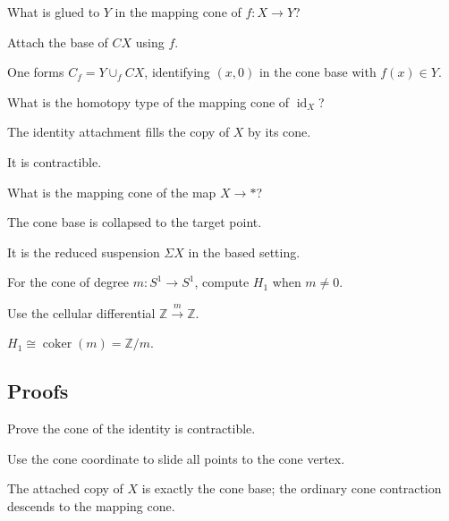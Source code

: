 \begin{exercise}\label{exr:viii07-ped-02}
What is glued to $Y$ in the mapping cone of $f:X\to Y$?
\end{exercise}
\begin{hint}
Attach the base of $CX$ using $f$.
\end{hint}
\begin{solution}
One forms $C_f=Y\cup_f CX$, identifying $(x,0)$ in the cone base with $f(x)\in Y$.
\end{solution}

\begin{exercise}\label{exr:viii07-ped-03}
What is the homotopy type of the mapping cone of $\operatorname{id}_X$?
\end{exercise}
\begin{hint}
The identity attachment fills the copy of $X$ by its cone.
\end{hint}
\begin{solution}
It is contractible.
\end{solution}

\begin{exercise}\label{exr:viii07-ped-04}
What is the mapping cone of the map $X\to *$?
\end{exercise}
\begin{hint}
The cone base is collapsed to the target point.
\end{hint}
\begin{solution}
It is the reduced suspension $\Sigma X$ in the based setting.
\end{solution}

\begin{exercise}\label{exr:viii07-ped-05}
For the cone of degree $m:S^1\to S^1$, compute $H_1$ when $m\ne0$.
\end{exercise}
\begin{hint}
Use the cellular differential $\mathbb Z\xrightarrow{m}\mathbb Z$.
\end{hint}
\begin{solution}
$H_1\cong\operatorname{coker}(m)=\mathbb Z/m$.
\end{solution}

\subsection*{Proofs}

\begin{exercise}\label{exr:viii07-ped-06}
Prove the cone of the identity is contractible.
\end{exercise}
\begin{hint}
Use the cone coordinate to slide all points to the cone vertex.
\end{hint}
\begin{solution}
The attached copy of $X$ is exactly the cone base; the ordinary cone contraction descends to the mapping cone.
\end{solution}

